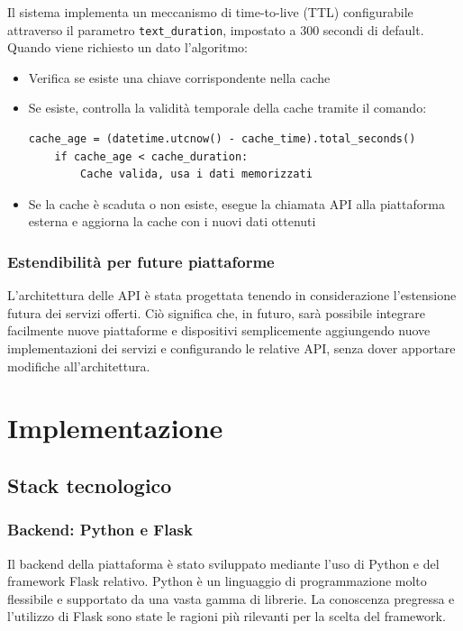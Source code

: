 \documentclass[12pt,a4paper,oneside]{report}
\begin{document}
Il sistema implementa un meccanismo di time-to-live (TTL) configurabile attraverso il parametro \texttt{text\_duration}, impostato a 300 secondi di default. Quando viene richiesto un dato l'algoritmo:
\begin{itemize}
    \item Verifica se esiste una chiave corrispondente nella cache
    \item Se esiste, controlla la validità temporale della cache tramite il comando:
          \begin{lstlisting}[basicstyle=\small\ttfamily, breaklines=true]
    cache_age = (datetime.utcnow() - cache_time).total_seconds()
    if cache_age < cache_duration:
        Cache valida, usa i dati memorizzati
    \end{lstlisting}
    \item Se la cache è scaduta o non esiste, esegue la chiamata API alla piattaforma esterna e aggiorna la cache con i nuovi dati ottenuti

\end{itemize}

\subsection{Estendibilità per future piattaforme}
L'architettura delle API è stata progettata tenendo in considerazione l'estensione futura dei servizi offerti. Ciò significa che, in futuro, sarà possibile integrare facilmente nuove piattaforme e dispositivi semplicemente aggiungendo nuove implementazioni dei servizi e configurando le relative API, senza dover apportare modifiche all'architettura.



\chapter{Implementazione}
\section{Stack tecnologico}
\subsection{Backend: Python e Flask}
Il backend della piattaforma è stato sviluppato mediante l'uso di Python e del framework Flask relativo. Python è un linguaggio di programmazione molto flessibile e supportato da una vasta gamma di librerie. La conoscenza pregressa e l'utilizzo di Flask sono state le ragioni più rilevanti per la scelta del framework.
\end{document}
